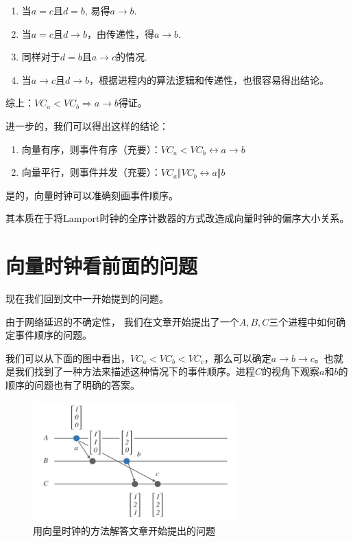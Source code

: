 \documentclass[cn,11pt,chinese]{elegantbook}
\begin{document}
\begin{enumerate}
    \item 当$a = c$且$d = b$, 易得$a \rightarrow b$.
    \item 当$a = c$且$d \rightarrow b$，由传递性，得$a \rightarrow b$.
    \item 同样对于$d = b$且$a \rightarrow c$的情况.
    \item 当$a \rightarrow c$且$d \rightarrow b$，根据进程内的算法逻辑和传递性，也很容易得出结论。
\end{enumerate}

综上：$VC_a < VC_b \Rightarrow a \rightarrow b$得证。

进一步的，我们可以得出这样的结论：

\begin{enumerate}
    \item 向量有序，则事件有序（充要）：$VC_a < VC_b \leftrightarrow a \rightarrow b$
    \item 向量平行，则事件并发（充要）：$VC_a \Vert VC_b \leftrightarrow a \Vert b$
\end{enumerate}

是的，向量时钟可以准确刻画事件顺序。

其本质在于将Lamport时钟的全序计数器的方式改造成向量时钟的偏序大小关系。

\section{向量时钟看前面的问题}

现在我们回到文中一开始提到的问题。

由于网络延迟的不确定性， 我们在文章开始提出了一个$A,B,C$三个进程中如何确定事件顺序的问题。

我们可以从下面的图中看出，$VC_a < VC_b < VC_c$，那么可以确定$a \rightarrow b \rightarrow c$。也就是我们找到了一种方法来描述这种情况下的事件顺序。进程$C$的视角下观察$a$和$b$的顺序的问题也有了明确的答案。

\begin{figure}
    \centering
    \includegraphics[width=0.7\textwidth]{images/appendix-a-16.jpeg}
    \caption{用向量时钟的方法解答文章开始提出的问题}
\end{figure}
\end{document}
